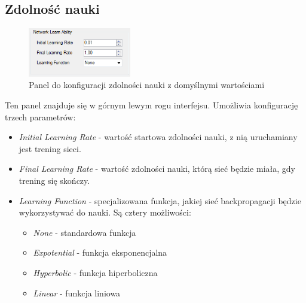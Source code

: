 \documentclass[a4paper]{article}
\begin{document}
			\subsection{Zdolność nauki}
				\begin{figure}[h!]
					\centering
					\includegraphics[width=0.40\textwidth]{./img/GUI_initial_learning}
					\caption{Panel do konfiguracji zdolności nauki z domyślnymi wartościami}
				\end{figure}
				Ten panel znajduje się w górnym lewym rogu interfejsu. Umożliwia konfigurację trzech parametrów:
				\begin{itemize}
					\item \emph{Initial Learning Rate} - wartość startowa zdolności nauki, z nią uruchamiany jest trening sieci.
					\item \emph{Final Learning Rate} - wartość zdolności nauki, którą sieć będzie miała, gdy trening się skończy.
					\item \emph{Learning Function} - specjalizowana funkcja, jakiej sieć backpropagacji będzie wykorzystywać do nauki. Są cztery możliwości:
					\begin{itemize}
						\item \emph{None} - standardowa funkcja
						\item \emph{Expotential} - funkcja eksponencjalna
						\item \emph{Hyperbolic} - funkcja hiperboliczna
						\item \emph{Linear} - funkcja liniowa
					\end{itemize}
				\end{itemize}
\end{document}

